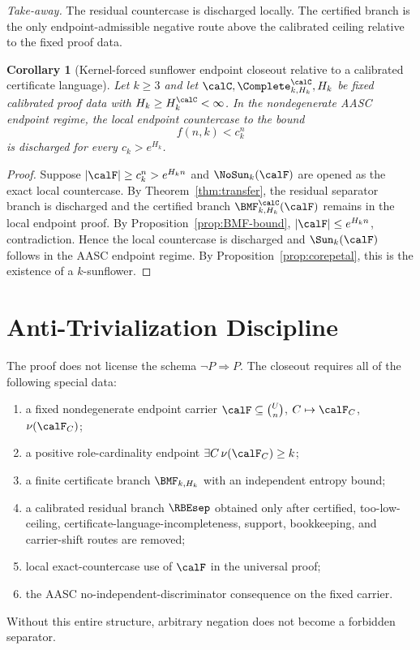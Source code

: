 \documentclass[11pt]{article}
\newtheorem{corollary}[theorem]{Corollary}
\begin{document}
\noindent\emph{Take-away.} The residual countercase is discharged locally.  The certified branch is the only endpoint-admissible negative route above the calibrated ceiling relative to the fixed proof data.

\begin{corollary}[Kernel-forced sunflower endpoint closeout relative to a calibrated certificate language]\label{cor:aasc-sunflower}
Let \(k\ge3\) and let \(\calC,\Complete^{\calC}_{k,H_k},H_k\) be fixed calibrated proof data with \(H_k\ge H_k^{\calC}<\infty\).  In the nondegenerate AASC endpoint regime, the local endpoint countercase to the bound
\[
  f(n,k)<c_k^n
\]
is discharged for every \(c_k>e^{H_k}\).
\end{corollary}

\begin{proof}
Suppose \(|\calF|\ge c_k^n>e^{H_kn}\) and \(\NoSun_k(\calF)\) are opened as the exact local countercase.  By Theorem~\ref{thm:transfer}, the residual separator branch is discharged and the certified branch \(\BMF^{\calC}_{k,H_k}(\calF)\) remains in the local endpoint proof.  By Proposition~\ref{prop:BMF-bound}, \(|\calF|\le e^{H_kn}\), contradiction.  Hence the local countercase is discharged and \(\Sun_k(\calF)\) follows in the AASC endpoint regime.  By Proposition~\ref{prop:corepetal}, this is the existence of a \(k\)-sunflower.
\end{proof}

\section{Anti-Trivialization Discipline}

The proof does not license the schema \(\neg P\Rightarrow P\).  The closeout requires all of the following special data:
\begin{enumerate}[label=(\roman*)]
\item a fixed nondegenerate endpoint carrier \(\calF\subseteq\binom{U}{n}\), \(C\mapsto\calF_C\), \(\nu(\calF_C)\);
\item a positive role-cardinality endpoint \(\exists C\,\nu(\calF_C)\ge k\);
\item a finite certificate branch \(\BMF_{k,H_k}\) with an independent entropy bound;
\item a calibrated residual branch \(\RBEsep\) obtained only after certified, too-low-ceiling, certificate-language-incompleteness, support, bookkeeping, and carrier-shift routes are removed;
\item local exact-countercase use of \(\calF\) in the universal proof;
\item the AASC no-independent-discriminator consequence on the fixed carrier.
\end{enumerate}
Without this entire structure, arbitrary negation does not become a forbidden separator.
\end{document}
